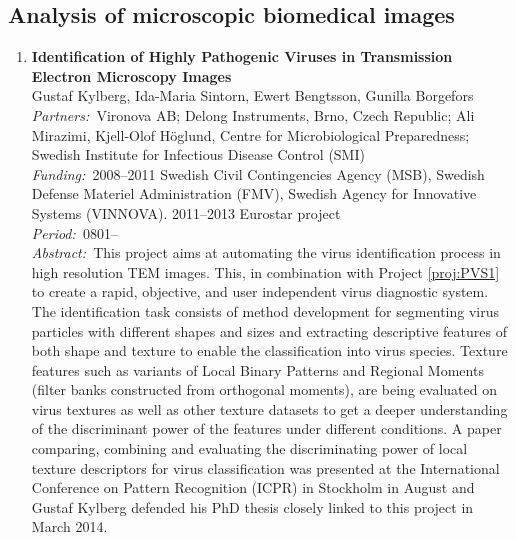 \documentclass[10pt, a4paper]{article}
\newcommand{\aabstract}[1]{\emph{Abstract:~}#1}
\newcommand{\ffunding}[1]{\emph{Funding:~}#1\\}
\newcommand{\ppartners}[1]{\emph{Partners:~}#1\\}
\newcommand{\pperiod}[1]{\emph{Period:~}#1\\}
\begin{document}
{%
\vfill

\subsection{Analysis of microscopic biomedical images}
\begin{enumerate}
	\setcounter{enumi}{0}

\item
\label{proj:PVS2}
\textbf{Identification of Highly Pathogenic Viruses in Transmission Electron Microscopy Images}\\
Gustaf Kylberg, Ida-Maria Sintorn, Ewert Bengtsson, Gunilla Borgefors\\
\ppartners{Vironova AB; Delong Instruments, Brno, Czech Republic; Ali Mirazimi, Kjell-Olof H\"{o}glund, Centre for Microbiological Preparedness; Swedish Institute for Infectious Disease Control (SMI)}
\ffunding{2008--2011 Swedish Civil Contingencies Agency (MSB), Swedish Defense Materiel Administration (FMV), Swedish Agency for Innovative Systems (VINNOVA). 2011--2013 Eurostar project}
\pperiod{0801--}
\aabstract{This project aims at automating the virus identification process in high resolution TEM images. This, in combination with Project \ref{proj:PVS1} to create a rapid, objective, and user independent virus diagnostic system. The identification task consists of method development for segmenting virus particles with different shapes and sizes and extracting descriptive features of both shape and texture to enable the classification into virus species. Texture features such as variants of Local Binary Patterns and Regional Moments (filter banks constructed from orthogonal moments), are being evaluated on virus textures as well as other texture datasets to get a deeper understanding of the discriminant power of the features under different conditions. A paper comparing, combining and evaluating the discriminating power of local texture descriptors for virus classification was presented at the International Conference on Pattern Recognition (ICPR) in Stockholm in August and Gustaf Kylberg defended his PhD thesis closely linked to this project in March 2014.} 



\end{enumerate}}
\end{document}
